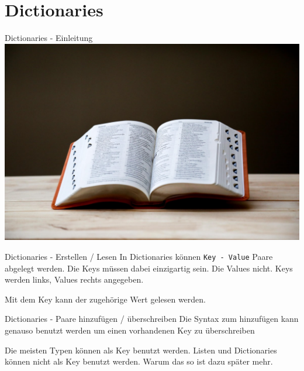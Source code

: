 \section{Dictionaries}
\begin{frame}{Dictionaries - Einleitung}
	\includegraphics[width=\linewidth]{resources/03bool_fun_dict/lexikon.jpeg}
\end{frame}
\begin{frame}{Dictionaries - Erstellen / Lesen}
	In Dictionaries können \alert{\texttt{Key - Value}} Paare abgelegt werden.
	\linebreak
	Die Keys müssen dabei einzigartig sein. Die Values nicht.
	\linebreak
	Keys werden links, Values rechts angegeben.
	
	Mit dem Key kann der zugehörige Wert gelesen werden.
	
\end{frame}
\begin{frame}{Dictionaries - Paare hinzufügen / überschreiben}
	Die Syntax zum hinzufügen kann genauso benutzt werden um einen vorhandenen Key zu überschreiben
	
	
	Die meisten Typen können als Key benutzt werden. Listen und Dictionaries können nicht als Key benutzt werden. Warum das so ist dazu später mehr.
	
\end{frame}


